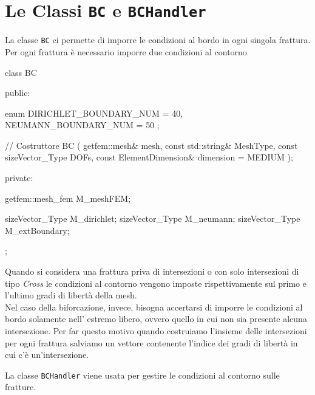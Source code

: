 \section{Le Classi \texttt{BC} e \texttt{BCHandler}}
La classe \texttt{BC} ci permette di imporre le condizioni al bordo in ogni singola frattura. Per ogni frattura è necessario imporre due condizioni al contorno\\ 

\begin{Code}[caption={Classe \texttt{BC}}]
class BC
{
 public:

    enum
    {
        DIRICHLET_BOUNDARY_NUM = 40,
        NEUMANN_BOUNDARY_NUM = 50
    };

    // Costruttore
    BC ( getfem::mesh& mesh,
         const std::string& MeshType,
         const sizeVector_Type DOFs,
         const ElementDimension& dimension = MEDIUM );

 private:

    getfem::mesh_fem M_meshFEM;
    
    sizeVector_Type M_dirichlet;
    sizeVector_Type M_neumann;
    sizeVector_Type M_extBoundary;   
};
\end{Code}

Quando si considera una frattura priva di intersezioni o con solo intersezioni di tipo \textit{Cross} le condizioni al contorno vengono imposte rispettivamente sul primo e l'ultimo gradi di libertà della mesh.\\
Nel caso della biforcazione, invece, bisogna accertarsi di imporre le condizioni al bordo solamente nell' estremo libero, ovvero quello in cui non sia presente alcuna intersezione. 
Per far questo motivo quando costruiamo l'insieme delle intersezioni per ogni frattura salviamo un vettore contenente l'indice dei gradi di libertà in cui c'è un'intersezione.

La classe \texttt{BCHandler} viene usata per gestire le condizioni al contorno sulle fratture.
